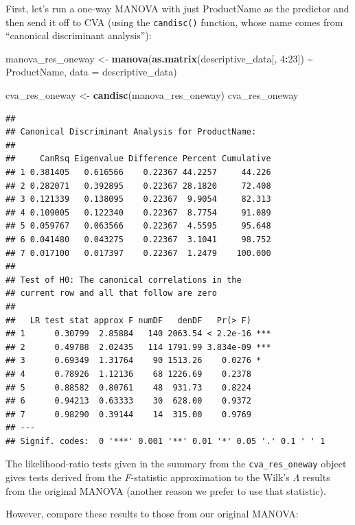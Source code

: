 \documentclass[
]{book}
\newenvironment{Shaded}{\begin{snugshade}}{\end{snugshade}}
\newcommand{\AttributeTok}[1]{\textcolor[rgb]{0.13,0.29,0.53}{#1}}
\newcommand{\DecValTok}[1]{\textcolor[rgb]{0.00,0.00,0.81}{#1}}
\newcommand{\FunctionTok}[1]{\textcolor[rgb]{0.13,0.29,0.53}{\textbf{#1}}}
\newcommand{\NormalTok}[1]{#1}
\newcommand{\OtherTok}[1]{\textcolor[rgb]{0.56,0.35,0.01}{#1}}
\newcommand{\SpecialCharTok}[1]{\textcolor[rgb]{0.81,0.36,0.00}{\textbf{#1}}}
\begin{document}
First, let's run a one-way MANOVA with just ProductName as the predictor and then send it off to CVA (using the \texttt{candisc()} function, whose name comes from ``canonical discriminant analysis''):

\begin{Shaded}
\begin{Highlighting}[]
\NormalTok{manova\_res\_oneway }\OtherTok{\textless{}{-}} 
  \FunctionTok{manova}\NormalTok{(}\FunctionTok{as.matrix}\NormalTok{(descriptive\_data[, }\DecValTok{4}\SpecialCharTok{:}\DecValTok{23}\NormalTok{]) }\SpecialCharTok{\textasciitilde{}}\NormalTok{ ProductName, }
         \AttributeTok{data =}\NormalTok{ descriptive\_data)}

\NormalTok{cva\_res\_oneway }\OtherTok{\textless{}{-}} \FunctionTok{candisc}\NormalTok{(manova\_res\_oneway)}
\NormalTok{cva\_res\_oneway}
\end{Highlighting}
\end{Shaded}

\begin{verbatim}
## 
## Canonical Discriminant Analysis for ProductName:
## 
##     CanRsq Eigenvalue Difference Percent Cumulative
## 1 0.381405   0.616566    0.22367 44.2257     44.226
## 2 0.282071   0.392895    0.22367 28.1820     72.408
## 3 0.121339   0.138095    0.22367  9.9054     82.313
## 4 0.109005   0.122340    0.22367  8.7754     91.089
## 5 0.059767   0.063566    0.22367  4.5595     95.648
## 6 0.041480   0.043275    0.22367  3.1041     98.752
## 7 0.017100   0.017397    0.22367  1.2479    100.000
## 
## Test of H0: The canonical correlations in the 
## current row and all that follow are zero
## 
##   LR test stat approx F numDF   denDF   Pr(> F)    
## 1      0.30799  2.85884   140 2063.54 < 2.2e-16 ***
## 2      0.49788  2.02435   114 1791.99 3.834e-09 ***
## 3      0.69349  1.31764    90 1513.26    0.0276 *  
## 4      0.78926  1.12136    68 1226.69    0.2378    
## 5      0.88582  0.80761    48  931.73    0.8224    
## 6      0.94213  0.63333    30  628.00    0.9372    
## 7      0.98290  0.39144    14  315.00    0.9769    
## ---
## Signif. codes:  0 '***' 0.001 '**' 0.01 '*' 0.05 '.' 0.1 ' ' 1
\end{verbatim}

The likelihood-ratio tests given in the summary from the \texttt{cva\_res\_oneway} object gives tests derived from the \emph{F}-statistic approximation to the Wilk's \(\Lambda\) results from the original MANOVA (another reason we prefer to use that statistic).

However, compare these results to those from our original MANOVA:
\end{document}

